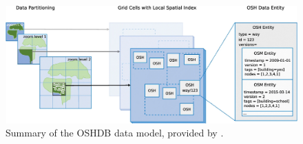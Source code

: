 \begin{figure} %
    \centering %
    \includegraphics[width = \textwidth]{Images/oshdb.PNG} %
    \caption{Summary of the OSHDB data model, provided by \textcite{raifer_oshdb_2019}.} %
    \label{fig:oshdb} %
\end{figure}




    


